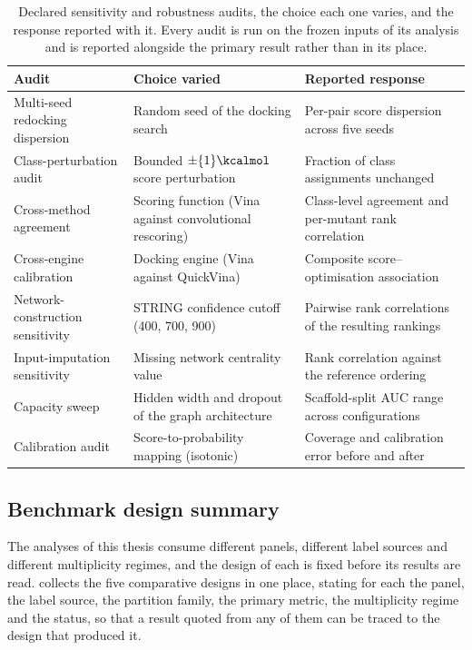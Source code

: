\begin{table}[htbp]
	\centering
	\caption[Declared sensitivity and robustness audits]{Declared sensitivity and robustness audits, the choice each one varies, and the response reported with it. Every audit is run on the frozen inputs of its analysis and is reported alongside the primary result rather than in its place.}
	\label{tab:met_sensitivity}
	\small
	\begin{tabularx}{\textwidth}{X X X}
		\toprule
		Audit & Choice varied & Reported response \\
		\midrule
		Multi-seed redocking dispersion & Random seed of the docking search & Per-pair score dispersion across five seeds \\
		Class-perturbation audit & Bounded $\pm\qty{1}{\kcalmol}$ score perturbation & Fraction of class assignments unchanged \\
		Cross-method agreement & Scoring function (Vina against convolutional rescoring) & Class-level agreement and per-mutant rank correlation \\
		Cross-engine calibration & Docking engine (Vina against QuickVina) & Composite score--optimisation association \\
		Network-construction sensitivity & STRING confidence cutoff (\num{400}, \num{700}, \num{900}) & Pairwise rank correlations of the resulting rankings \\
		Input-imputation sensitivity & Missing network centrality value & Rank correlation against the reference ordering \\
		Capacity sweep & Hidden width and dropout of the graph architecture & Scaffold-split AUC range across configurations \\
		Calibration audit & Score-to-probability mapping (isotonic) & Coverage and calibration error before and after \\
		\bottomrule
	\end{tabularx}
\end{table}

\subsection{Benchmark design summary}

The analyses of this thesis consume different panels, different label sources and different multiplicity regimes, and the design of each is fixed before its results are read.  collects the five comparative designs in one place, stating for each the panel, the label source, the partition family, the primary metric, the multiplicity regime and the status, so that a result quoted from any of them can be traced to the design that produced it.

